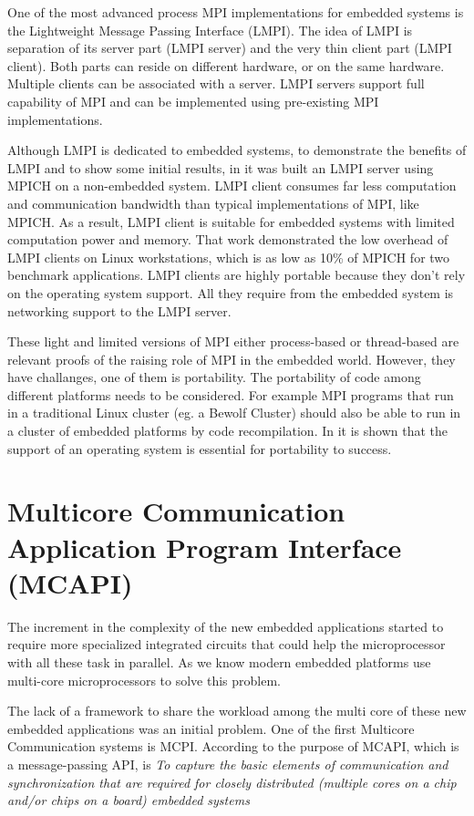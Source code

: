 One of the most advanced process MPI implementations for embedded systems is
the Lightweight Message Passing Interface (LMPI)\cite{Abgaria}. The idea of
LMPI is separation of its server part (LMPI server) and the very thin client
part (LMPI client). Both parts can reside on different hardware, or on the same
hardware. Multiple clients can be associated with a server. LMPI servers
support full capability of MPI and can be implemented using pre-existing MPI
implementations. 

Although LMPI is dedicated to embedded systems, to demonstrate the benefits of
LMPI and to show some initial results, in \cite{Abgaria} it was  built an LMPI
server using MPICH on a non-embedded system. LMPI client consumes far less
computation and communication bandwidth than typical implementations of MPI,
like MPICH.  As a result, LMPI client is suitable for embedded systems with
limited computation power and memory. That work demonstrated the low overhead
of LMPI clients on Linux workstations, which is as low as 10\% of MPICH for two
benchmark applications.  LMPI clients are highly portable because they don't
rely on the operating system support. All they require from the embedded system
is networking support to the LMPI server.

These light and limited versions of MPI either process-based or thread-based
are relevant proofs of the raising role of MPI in the embedded world. However,
they have challanges, one of them is portability. The portability of code among
different platforms needs to be considered. For example MPI programs that run
in a traditional Linux cluster (eg. a Bewolf Cluster) should also be able to
run in a cluster of embedded platforms  by code recompilation.  In
\cite{Gallego} it is shown that the support of an operating system is essential
for portability to success.

\section{Multicore Communication Application Program Interface (MCAPI)}

The increment in the complexity of the new embedded applications started to
require more specialized integrated circuits that could help the microprocessor
with all these task in parallel. As we know modern embedded platforms use
multi-core microprocessors to solve this problem.

The lack of a framework to share the workload among the multi core of these new embedded
applications was an initial problem. One of the first Multicore Communication systems is MCPI.
According to \cite{MCAPI} the purpose of MCAPI, which is a message-passing API,
is \textit{To capture the basic elements of communication and synchronization
that are required for closely distributed (multiple cores on a chip and/or
chips on a board) embedded systems} 

